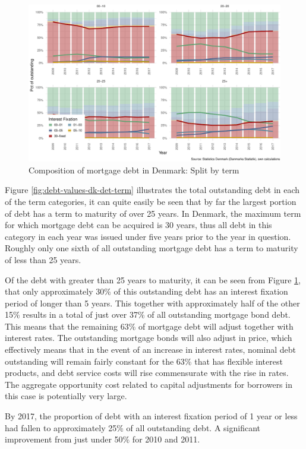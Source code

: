\documentclass[
]{book}
\begin{document}
\begin{figure}
\centering
\includegraphics{figures/debt-composition-dk-det-term-1.pdf}
\caption{\label{fig:debt-composition-dk-det-term}Composition of mortgage debt in Denmark: Split by term}
\end{figure}

Figure \ref{fig:debt-values-dk-det-term} illustrates the total outstanding debt in each of the term categories, it can quite easily be seen that by far the largest portion of debt has a term to maturity of over 25 years. In Denmark, the maximum term for which mortgage debt can be acquired is 30 years, thus all debt in this category in each year was issued under five years prior to the year in question. Roughly only one sixth of all outstanding mortgage debt has a term to maturity of less than 25 years.

Of the debt with greater than 25 years to maturity, it can be seen from Figure \ref{fig:debt-composition-dk-det-term}, that only approximately 30\% of this outstanding debt has an interest fixation period of longer than 5 years. This together with approximately half of the other 15\% results in a total of just over 37\% of all outstanding mortgage bond debt. This means that the remaining 63\% of mortgage debt will adjust together with interest rates. The outstanding mortgage bonds will also adjust in price, which effectively means that in the event of an increase in interest rates, nominal debt outstanding will remain fairly constant for the 63\% that has flexible interest products, and debt service costs will rise commensurate with the rise in rates. The aggregate opportunity cost related to capital adjustments for borrowers in this case is potentially very large.

By 2017, the proportion of debt with an interest fixation period of 1 year or less had fallen to approximately 25\% of all outstanding debt. A significant improvement from just under 50\% for 2010 and 2011.
\end{document}
